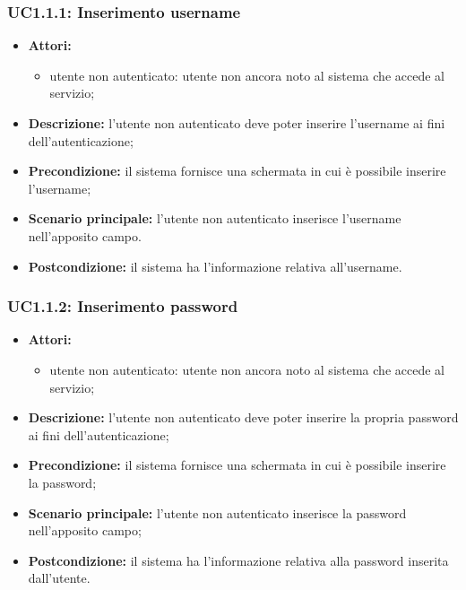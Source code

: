 \subsubsection{UC1.1.1: Inserimento username}
\begin{itemize}
	\item \textbf{Attori:}
	\begin{itemize}
		\item utente non autenticato: utente non ancora noto al sistema che accede al servizio;
	\end{itemize}
	\item \textbf{Descrizione:} l'utente non autenticato deve poter inserire l'username ai fini dell'autenticazione;
	\item \textbf{Precondizione:} il sistema fornisce una schermata in cui è possibile inserire l’username;
	\item \textbf{Scenario principale:} l'utente non autenticato inserisce l'username nell'apposito campo.
	\item \textbf{Postcondizione:} il sistema ha l'informazione relativa all'username.

\end{itemize}

\subsubsection{UC1.1.2: Inserimento password}
\begin{itemize}
	\item \textbf{Attori:}
	\begin{itemize}
		\item utente non autenticato: utente non ancora noto al sistema che accede al servizio;
	\end{itemize}
	\item \textbf{Descrizione:} l'utente non autenticato deve poter inserire la propria password ai fini dell'autenticazione;
	\item \textbf{Precondizione:} il sistema fornisce una schermata in cui è possibile inserire la password;
	\item \textbf{Scenario principale:} l'utente non autenticato inserisce la password nell'apposito campo;
	\item \textbf{Postcondizione:} il sistema ha l'informazione relativa alla password inserita dall'utente.
\end{itemize}

